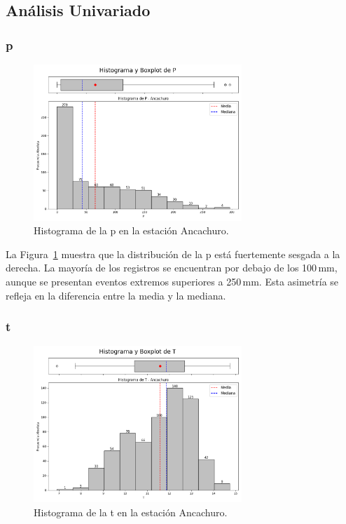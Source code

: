 \subsection{Análisis Univariado}

\subsubsection*{\gls{p}}

\begin{figure}[htbp]
\centering
\includegraphics[width=0.7\textwidth]{resultados/por_estacion_meteorologica/Ancachuro/P_histograma.png}
\caption{Histograma de la \gls{p} en la estación Ancachuro.}
\label{fig:ancachuro_P}
\end{figure}

La Figura~\ref{fig:ancachuro_P} muestra que la distribución de la \gls{p} está fuertemente sesgada a la derecha. La mayoría de los registros se encuentran por debajo de los 100\,mm, aunque se presentan eventos extremos superiores a 250\,mm. Esta asimetría se refleja en la diferencia entre la media y la mediana.

\subsubsection*{\gls{t}}

\begin{figure}[htbp]
\centering
\includegraphics[width=0.7\textwidth]{resultados/por_estacion_meteorologica/Ancachuro/T_histograma.png}
\caption{Histograma de la \gls{t} en la estación Ancachuro.}
\label{fig:ancachuro_T}
\end{figure}

